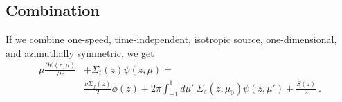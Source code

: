 \documentclass[12pt]{article}
\newcommand{\vOmega}{\ensuremath{\hat{\Omega}}}
\begin{document}
\subsection*{Combination}
If we combine one-speed, time-independent, isotropic source, one-dimensional, and azimuthally symmetric, we get
\begin{align*}
\mu \frac{\partial \psi(z, \mu)}{\partial z} &+ \Sigma_t(z)\psi(z, \mu) = \\
&\frac{\nu\Sigma_f(z) }{2}\phi(z) + 2\pi\int_{-1}^1 d\mu'\: \Sigma_s(z, \mu_0)\psi(z, \mu')  + \frac{S(z)}{2} \:.
\end{align*}

\end{document}
